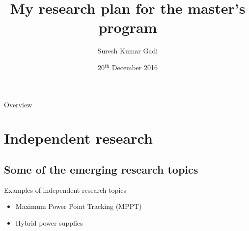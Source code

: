 \documentclass{beamer}
\title{My research plan for the master's program}
\author{Suresh Kumar Gadi}
\date{20$^{\mbox{th}}$ December 2016}
\institute{FIME-UT, UAdeC}
\begin{document}
\frame{\titlepage}
\begin{frame}{Overview}
	\tableofcontents
\end{frame}
\section{Independent research}
\subsection{Some of the emerging research topics}
\begin{frame}{Examples of independent research topics}
	\begin{itemize}
		\item Maximum Power Point Tracking (MPPT)
		\item Hybrid power supplies
	\end{itemize}
\end{frame}
\end{document}

